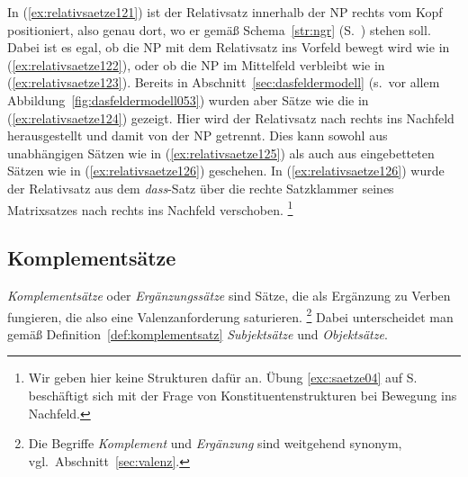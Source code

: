 \begin{exe}
  \ex\label{ex:relativsaetze121}
  \begin{xlist}
  \end{xlist}
  \ex\label{ex:relativsaetze124}
  \begin{xlist}
  \end{xlist}
\end{exe}

In (\ref{ex:relativsaetze121}) ist der Relativsatz innerhalb der NP rechts vom Kopf positioniert, also genau dort, wo er gemäß Schema~\ref{str:ngr} (S.~\pageref{str:ngr}) stehen soll.
Dabei ist es egal, ob die NP mit dem Relativsatz ins Vorfeld bewegt wird wie in (\ref{ex:relativsaetze122}), oder ob die NP im Mittelfeld verbleibt wie in (\ref{ex:relativsaetze123}).
Bereits in Abschnitt~\ref{sec:dasfeldermodell} (s.\ vor allem Abbildung~\ref{fig:dasfeldermodell053}) wurden aber Sätze wie die in (\ref{ex:relativsaetze124}) gezeigt.
Hier wird der Relativsatz nach rechts ins Nachfeld herausgestellt und damit von der NP getrennt.
Dies kann sowohl aus unabhängigen Sätzen wie in (\ref{ex:relativsaetze125}) als auch aus eingebetteten Sätzen wie in (\ref{ex:relativsaetze126}) geschehen.
In (\ref{ex:relativsaetze126}) wurde der Relativsatz aus dem \textit{dass}-Satz über die rechte Satzklammer seines Matrixsatzes nach rechts ins Nachfeld verschoben.%
\footnote{Wir geben hier keine Strukturen dafür an.
Übung \ref{exc:saetze04} auf S.~\pageref{exc:saetze04} beschäftigt sich mit der Frage von Konstituentenstrukturen bei Bewegung ins Nachfeld.}

\subsection{Komplementsätze}
\label{sec:komplementsaetze}

\textit{Komplementsätze} oder \textit{Ergänzungssätze} sind Sätze, die als Ergänzung zu Verben fungieren, die also eine Valenzanforderung saturieren.%
\footnote{Die Begriffe \textit{Komplement} und \textit{Ergänzung} sind weitgehend synonym, vgl.\ Abschnitt~\ref{sec:valenz}.}
Dabei unterscheidet man gemäß Definition~\ref{def:komplementsatz} \textit{Subjektsätze} und \textit{Objektsätze}.

